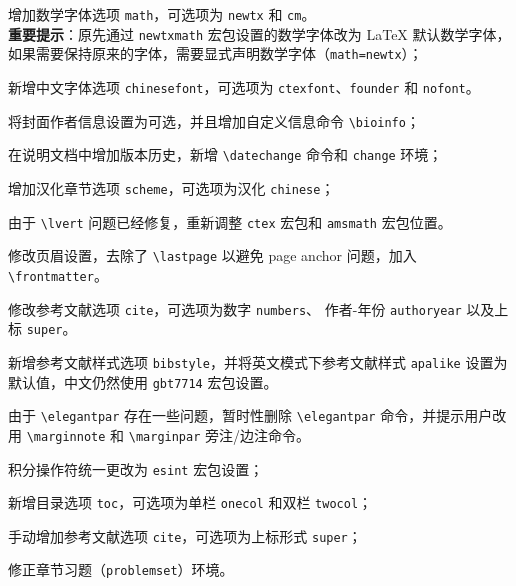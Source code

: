\documentclass[cn,11pt]{elegantbook}
\begin{document}

\begin{change}
  \item 增加数学字体选项 \lstinline{math}，可选项为 \lstinline{newtx} 和 \lstinline{cm}。\\
  \textbf{重要提示}：原先通过 \lstinline{newtxmath} 宏包设置的数学字体改为 \LaTeX{} 默认数学字体，如果需要保持原来的字体，需要显式声明数学字体（\lstinline{math=newtx}）；
  \item 新增中文字体选项 \lstinline{chinesefont}，可选项为 \lstinline{ctexfont}、\lstinline{founder} 和 \lstinline{nofont}。
  \item 将封面作者信息设置为可选，并且增加自定义信息命令 \lstinline{\bioinfo}；
  \item 在说明文档中增加版本历史，新增 \lstinline{\datechange} 命令和 \lstinline{change} 环境；
  \item 增加汉化章节选项 \lstinline{scheme}，可选项为汉化 \lstinline{chinese}；
  \item 由于 \lstinline{\lvert} 问题已经修复，重新调整 \lstinline{ctex} 宏包和 \lstinline{amsmath} 宏包位置。
  \item 修改页眉设置，去除了 \lstinline{\lastpage} 以避免 page anchor 问题，加入 \lstinline{\frontmatter}。
  \item 修改参考文献选项 \lstinline{cite}，可选项为数字 \lstinline{numbers}、 作者-年份 \lstinline{authoryear} 以及上标 \lstinline{super}。
  \item 新增参考文献样式选项 \lstinline{bibstyle}，并将英文模式下参考文献样式 \lstinline{apalike} 设置为默认值，中文仍然使用 \lstinline{gbt7714} 宏包设置。
\end{change}


\begin{change}
  \item 由于 \lstinline{\elegantpar} 存在一些问题，暂时性删除 \lstinline{\elegantpar} 命令，并提示用户改用 \lstinline{\marginnote} 和 \lstinline{\marginpar} 旁注/边注命令。
  \item 积分操作符统一更改为 \lstinline{esint} 宏包设置；
  \item 新增目录选项 \lstinline{toc}，可选项为单栏 \lstinline{onecol} 和双栏 \lstinline{twocol}；
  \item 手动增加参考文献选项 \lstinline{cite}，可选项为上标形式 \lstinline{super}；
  \item 修正章节习题（\lstinline{problemset}）环境。
\end{change}
\end{document}
